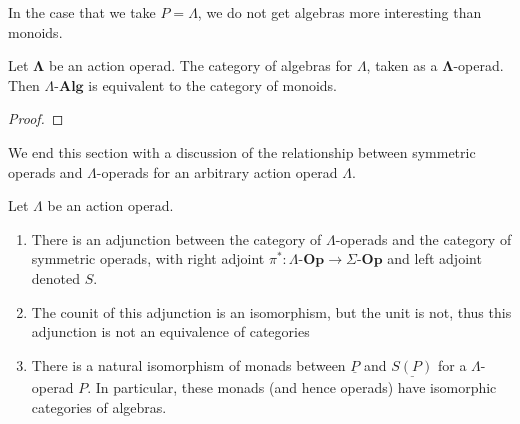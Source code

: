 \documentclass{amsbook} %
\newcommand{\mb}{\mathbf}
\newcommand{\ML}{\mathbf{\Lambda}}
\numberwithin{section}{chapter}
\begin{document}
In the case that we take $P = \Lambda$, we do not get algebras more interesting than monoids.
\begin{prop}
Let $\ML$ be an action operad. The category of algebras for $\Lambda$, taken as a $\ML$-operad. Then $\Lambda\mbox{-}\mb{Alg}$ is equivalent to the category of monoids.
\end{prop}
\begin{proof}


\end{proof}

We end this section with a discussion of the relationship between symmetric operads and $\Lambda$-operads for an arbitrary action operad $\Lambda$.

\begin{thm}\label{thm_sym}
Let $\Lambda$ be an action operad.
\begin{enumerate}
\item There is an adjunction between the category of $\Lambda$-operads and the category of symmetric operads, with right adjoint $\pi^{*}:\Lambda\mbox{-}\mb{Op} \to \Sigma\mbox{-}\mb{Op}$ and left adjoint denoted $S$.
\item The counit of this adjunction is an isomorphism, but the unit is not, thus this adjunction is not an equivalence of categories
\item There is a natural isomorphism of monads  between $\underline{P}$ and $\underline{S(P)}$ for a $\Lambda$-operad $P$.  In particular, these monads (and hence operads) have isomorphic categories of algebras.
\end{enumerate}
\end{thm}
\end{document}
